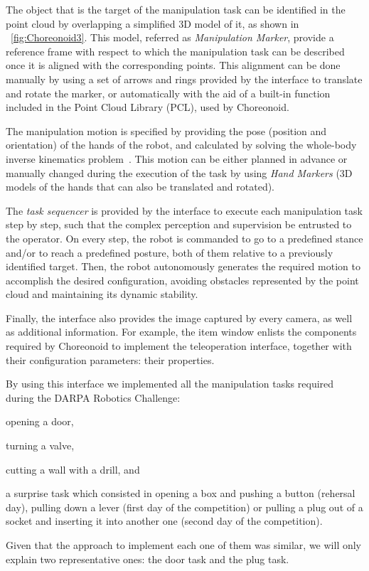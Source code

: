 	The object that is the target of the manipulation task can be identified in the point cloud
	by overlapping a simplified 3D model of it, as shown in \figurename~\ref{fig:Choreonoid3}.
	This model, referred as \emph{Manipulation Marker}, provide a reference frame with respect
	to which the manipulation task can be described once it is aligned with the corresponding
	points.
	This alignment can be done manually by using a set of arrows and rings provided by the interface
	to translate and rotate the marker, or automatically with the aid of a built-in function included
	in the Point Cloud Library (PCL), used by Choreonoid.
	
	The manipulation motion is specified by providing the pose (position and orientation)
	of the hands of the robot, and calculated by solving the whole-body inverse kinematics
	problem~\cite{Kanoun}.
	This motion can be either planned in advance or manually changed during the execution of the task
	by using \emph{Hand Markers} (3D models of the hands that can also be translated and rotated).
	
	The \emph{task sequencer} is provided by the interface to execute each manipulation
	task step by step, such that the complex perception and supervision be entrusted to the operator.
	On every step, the robot is commanded to go to a predefined stance and/or to reach a predefined posture,
	both of them relative to a previously identified target.
	Then, the robot autonomously generates the required motion to accomplish the desired configuration,
	avoiding obstacles represented by the point cloud and maintaining its dynamic stability.
	
	Finally, the interface also provides the image captured by every camera, as well as additional information.
	For example, the item window enlists the components required by Choreonoid to implement the teleoperation
	interface, together with their configuration parameters: their properties.
	
	By using this interface we implemented all the manipulation tasks required during the
	DARPA Robotics Challenge:
	\begin{inparaenum}[(1)]
		\item opening a door,
		\item turning a valve,
		\item cutting a wall with a drill, and
		\item a surprise task which consisted in opening a box and pushing a button (rehersal day),
					pulling down a lever (first day of the competition) or
					pulling a plug out of a socket and inserting it into another one (second day of the competition).
	\end{inparaenum}
	Given that the approach to implement each one of them was similar,
	we will only explain two representative ones:
	the door task and the plug task.